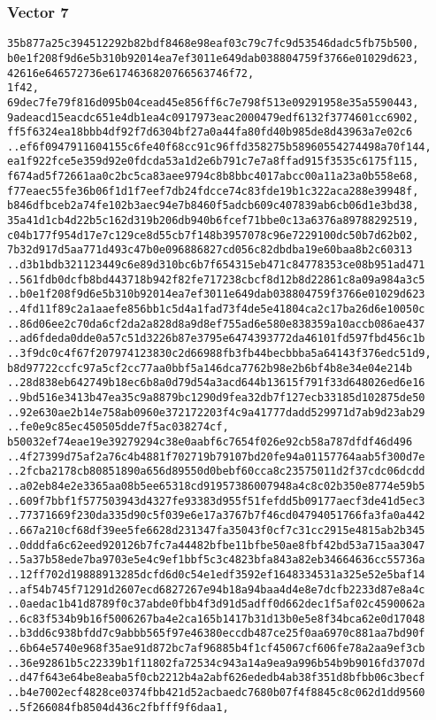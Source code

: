 \documentclass[
]{article}
\begin{document}
\hypertarget{vector-7-2}{%
\subsubsection{Vector 7}\label{vector-7-2}}

\begin{verbatim}
35b877a25c394512292b82bdf8468e98eaf03c79c7fc9d53546dadc5fb75b500,
b0e1f208f9d6e5b310b92014ea7ef3011e649dab038804759f3766e01029d623,
42616e646572736e6174636820766563746f72,
1f42,
69dec7fe79f816d095b04cead45e856ff6c7e798f513e09291958e35a5590443,
9adeacd15eacdc651e4db1ea4c0917973eac2000479edf6132f3774601cc6902,
ff5f6324ea18bbb4df92f7d6304bf27a0a44fa80fd40b985de8d43963a7e02c6
..ef6f0947911604155c6fe40f68cc91c96ffd358275b58960554274498a70f144,
ea1f922fce5e359d92e0fdcda53a1d2e6b791c7e7a8ffad915f3535c6175f115,
f674ad5f72661aa0c2bc5ca83aee9794c8b8bbc4017abcc00a11a23a0b558e68,
f77eaec55fe36b06f1d1f7eef7db24fdcce74c83fde19b1c322aca288e39948f,
b846dfbceb2a74fe102b3aec94e7b8460f5adcb609c407839ab6cb06d1e3bd38,
35a41d1cb4d22b5c162d319b206db940b6fcef71bbe0c13a6376a89788292519,
c04b177f954d17e7c129ce8d55cb7f148b3957078c96e7229100dc50b7d62b02,
7b32d917d5aa771d493c47b0e096886827cd056c82dbdba19e60baa8b2c60313
..d3b1bdb321123449c6e89d310bc6b7f654315eb471c84778353ce08b951ad471
..561fdb0dcfb8bd443718b942f82fe717238cbcf8d12b8d22861c8a09a984a3c5
..b0e1f208f9d6e5b310b92014ea7ef3011e649dab038804759f3766e01029d623
..4fd11f89c2a1aaefe856bb1c5d4a1fad73f4de5e41804ca2c17ba26d6e10050c
..86d06ee2c70da6cf2da2a828d8a9d8ef755ad6e580e838359a10accb086ae437
..ad6fdeda0dde0a57c51d3226b87e3795e6474393772da46101fd597fbd456c1b
..3f9dc0c4f67f207974123830c2d66988fb3fb44becbbba5a64143f376edc51d9,
b8d97722ccfc97a5cf2cc77aa0bbf5a146dca7762b98e2b6bf4b8e34e04e214b
..28d838eb642749b18ec6b8a0d79d54a3acd644b13615f791f33d648026ed6e16
..9bd516e3413b47ea35c9a8879bc1290d9fea32db7f127ecb33185d102875de50
..92e630ae2b14e758ab0960e372172203f4c9a41777dadd529971d7ab9d23ab29
..fe0e9c85ec450505dde7f5ac038274cf,
b50032ef74eae19e39279294c38e0aabf6c7654f026e92cb58a787dfdf46d496
..4f27399d75af2a76c4b4881f702719b79107bd20fe94a01157764aab5f300d7e
..2fcba2178cb80851890a656d89550d0bebf60cca8c23575011d2f37cdc06dcdd
..a02eb84e2e3365aa08b5ee65318cd91957386007948a4c8c02b350e8774e59b5
..609f7bbf1f577503943d4327fe93383d955f51fefdd5b09177aecf3de41d5ec3
..77371669f230da335d90c5f039e6e17a3767b7f46cd04794051766fa3fa0a442
..667a210cf68df39ee5fe6628d231347fa35043f0cf7c31cc2915e4815ab2b345
..0dddfa6c62eed920126b7fc7a44482bfbe11bfbe50ae8fbf42bd53a715aa3047
..5a37b58ede7ba9703e5e4c9ef1bbf5c3c4823bfa843a82eb34664636cc55736a
..12ff702d19888913285dcfd6d0c54e1edf3592ef1648334531a325e52e5baf14
..af54b745f71291d2607ecd6827267e94b18a94baa4d4e8e7dcfb2233d87e8a4c
..0aedac1b41d8789f0c37abde0fbb4f3d91d5adff0d662dec1f5af02c4590062a
..6c83f534b9b16f5006267ba4e2ca165b1417b31d13b0e5e8f34bca62e0d17048
..b3dd6c938bfdd7c9abbb565f97e46380eccdb487ce25f0aa6970c881aa7bd90f
..6b64e5740e968f35ae91d872bc7af96885b4f1cf45067cf606fe78a2aa9ef3cb
..36e92861b5c22339b1f11802fa72534c943a14a9ea9a996b54b9b9016fd3707d
..d47f643e64be8eaba5f0cb2212b4a2abf626ededb4ab38f351d8bfbb06c3becf
..b4e7002ecf4828ce0374fbb421d52acbaedc7680b07f4f8845c8c062d1dd9560
..5f266084fb8504d436c2fbfff9f6daa1,
\end{verbatim}
\end{document}
